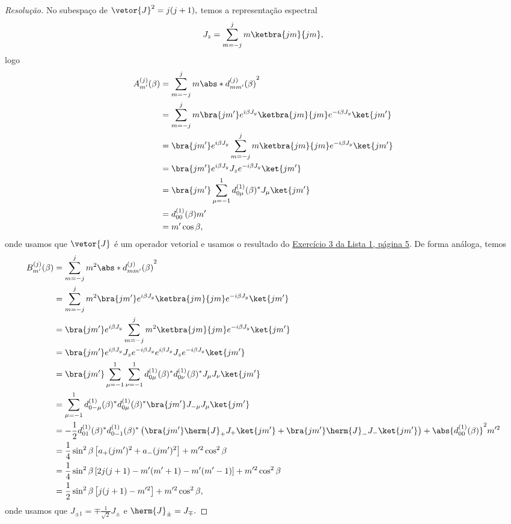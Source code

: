 \begin{proof}[Resolução]
   No subespaço de \(\vetor{J}^2 = j(j+1),\) temos a representação espectral
   \begin{equation*}
      J_z = \sum_{m = -j}^{j} m\ketbra{jm}{jm},
   \end{equation*}
   logo
   \begin{align*}
      A^{(j)}_{m'}(\beta) &= \sum_{m = - j}^j m\abs*{d^{(j)}_{mm'}(\beta)}^2\\
                          &= \sum_{m = - j}^j m\bra{jm'}e^{i \beta J_y}\ketbra{jm}{jm}e^{-i\beta J_y}\ket{jm'}\\
                          &= \bra{jm'} e^{i\beta J_y} \sum_{m = - j}^{j} m\ketbra{jm}{jm} e^{-i\beta J_y} \ket{jm'}\\
                          &= \bra{jm'} e^{i \beta J_y} J_z e^{-i \beta J_y} \ket{jm'}\\
                          &= \bra{jm'} \sum_{\mu = -1}^1 d^{(1)}_{0\mu}(\beta)^* J_\mu \ket{jm'}\\
                          &= d^{(1)}_{00}(\beta) m'\\
                          &= m' \cos\beta,
   \end{align*}
   onde usamos que \(\vetor{J}\) é um operador vetorial e usamos o resultado do \href{teste}{Exercício 3 da Lista 1, página 5}. De forma análoga, temos
   \begin{align*}
      B^{(j)}_{m'}(\beta) &= \sum_{m = - j}^j m^2\abs*{d^{(j)}_{mm'}(\beta)}^2\\
                          &= \sum_{m = - j}^j m^2\bra{jm'}e^{i \beta J_y}\ketbra{jm}{jm}e^{-i\beta J_y}\ket{jm'}\\
                          &= \bra{jm'} e^{i\beta J_y} \sum_{m = - j}^{j} m^2\ketbra{jm}{jm} e^{-i\beta J_y} \ket{jm'}\\
                          &= \bra{jm'} e^{i \beta J_y} J_z e^{-i\beta J_y} e^{i \beta J_y} J_z e^{-i \beta J_y} \ket{jm'}\\
                          &= \bra{jm'} \sum_{\mu = -1}^1 \sum_{\nu = - 1}^1 d^{(1)}_{0\mu}(\beta)^* d^{(1)}_{0\nu}(\beta)^*J_\mu J_\nu\ket{jm'}\\
                          &= \sum_{\mu = -1}^1 d^{(1)}_{0{-\mu}}(\beta)^* d^{(1)}_{0\mu}(\beta)^* \bra{jm'}J_{-\mu} J_\mu \ket{jm'}\\
                          &= -\frac12d^{(1)}_{01}(\beta)^* d^{(1)}_{0{-1}}(\beta)^* \left(\bra{jm'}\herm{J}_+J_+\ket{jm'} +\bra{jm'}\herm{J}_-J_-\ket{jm'}\right) + \abs{d^{(1)}_{00}(\beta)}^2 m'^2\\
                          &= \frac14 \sin^2\beta \left[a_+(jm')^2 + a_-(jm')^2\right] + m'^2\cos^2\beta\\
                          &= \frac14 \sin^2\beta \left[2j(j+1) - m'(m' + 1) - m'(m' - 1)\right] + m'^2 \cos^2\beta\\
                          &= \frac12 \sin^2\beta \left[j(j+1) - m'^2\right] + m'^2 \cos^2\beta,
   \end{align*}
   onde usamos que \(J_{\pm1} = \mp \frac{1}{\sqrt{2}} J_{\pm}\) e \(\herm{J}_{\pm} = J_{\mp}.\)


\end{proof}
